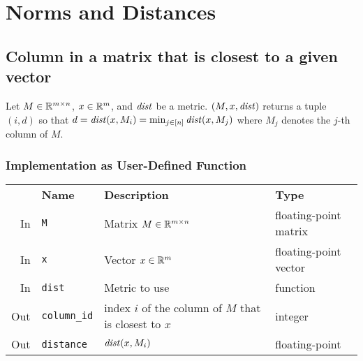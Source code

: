 \section{Norms and Distances}

\subsection{Column in a matrix that is closest to a given vector} \label{sec:matrix:closestColumn}

Let $M \in \mathbb{R}^{m \times n}$, $x \in \mathbb{R}^m$, and $\mathit{dist}$ be a metric. $(M, x, \mathit{dist})$ returns a tuple $(i,d)$ so that $d = \dist(x, M_i) = \min_{j \in \Nupto n} \dist(x, M_j)$ where $M_j$ denotes the $j$-th column of $M$.

\subsubsection{Implementation as User-Defined Function}

\begin{center}
	\begin{tabular}{rlll}
		\toprule%
		& \textbf{Name} & \textbf{Description} & \textbf{Type}
		\\\otoprule
		In &
		\texttt{M} &
		Matrix $M \in \mathbb{R}^{m \times n}$ &
		floating-point matrix
		\\\midrule
		In &
		\texttt{x} &
		Vector $x \in \mathbb{R}^m$ &
		floating-point vector
		\\\midrule
		In &
		\texttt{dist} &
		Metric to use &
		function
		\\\midrule
		Out &
		\texttt{column\_id} &
		index $i$ of the column of $M$ that is closest to $x$ &
		integer
		\\\midrule
		Out &
		\texttt{distance} &
		$\mathit{dist}(x, M_i)$ &
		floating-point
		\\\bottomrule
	\end{tabular}
\end{center}

